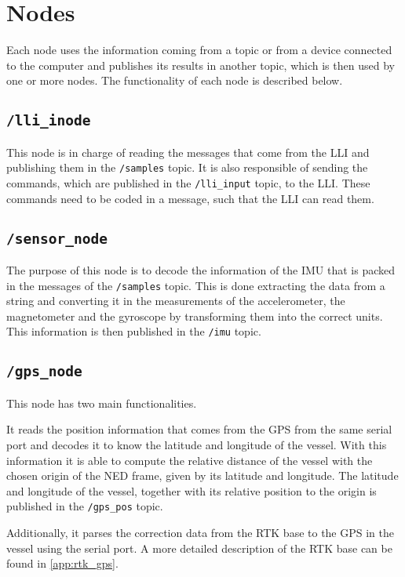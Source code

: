\section{Nodes}
Each node uses the information coming from a topic or from a device connected to the computer and publishes its results in another topic, which is then used by one or more nodes. The functionality of each node is described below.

\subsection*{\lstinline[style=cinline]{/lli_inode}}
This node is in charge of reading the messages that come from the LLI and publishing them in the \lstinline[style=cinline]{/samples} topic. It is also responsible of sending the commands, which are published in the \lstinline[style=cinline]{/lli_input} topic, to the LLI. These commands need to be coded in a message, such that the LLI can read them.

\subsection*{\lstinline[style=cinline]{/sensor_node}}
The purpose of this node is to decode the information of the IMU that is packed in the messages of the \lstinline[style=cinline]{/samples} topic. This is done extracting the data from a string and converting it in the measurements of the accelerometer, the magnetometer and the gyroscope by transforming them into the correct units. This information is then published in the \lstinline[style=cinline]{/imu} topic.

\subsection*{\lstinline[style=cinline]{/gps_node}}
This node has two main functionalities. 

It reads the position information that comes from the GPS from the same serial port and decodes it to know the latitude and longitude of the vessel. With this information it is able to compute the relative distance of the vessel with the chosen origin of the NED frame, given by its latitude and longitude. The latitude and longitude of the vessel, together with its relative position to the origin is published in the \lstinline[style=cinline]{/gps_pos} topic.

Additionally, it parses the correction data from the RTK base to the GPS in the vessel using the serial port. A more detailed description of the RTK base can be found in \autoref{app:rtk_gps}. 


